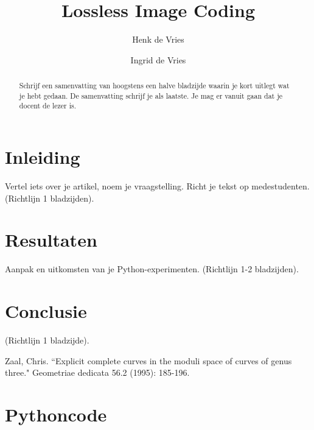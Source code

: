 \documentclass[progrenexp]{uvamath}
\title{Lossless Image Coding}
\author[henk@science.uva.nl, 6127901]{Henk de Vries}
\author[ingrid@science.uva.nl, 6123102]{Ingrid de Vries}
\begin{document}
\maketitle

\begin{abstract}
Schrijf een samenvatting van hoogstens een halve bladzijde waarin je kort uitlegt wat je hebt gedaan. De samenvatting schrijf je als laatste. Je mag er vanuit gaan dat je docent de lezer is.
\end{abstract}

\tableofcontents

\chapter{Inleiding}
Vertel iets over je artikel, noem je vraagstelling. Richt je tekst op medestudenten. (Richtlijn 1 bladzijden).

\chapter{Resultaten}
Aanpak en uitkomsten van je Python-experimenten. (Richtlijn 1-2 bladzijden).

\chapter{Conclusie}
(Richtlijn 1 bladzijde).

\clearpage%
\begin{thebibliography}{}
Zaal, Chris. ``Explicit complete curves in the moduli space of curves of genus three." Geometriae dedicata 56.2 (1995): 185-196.
\end{thebibliography}

\appendix

\chapter{Pythoncode}
\end{document}
